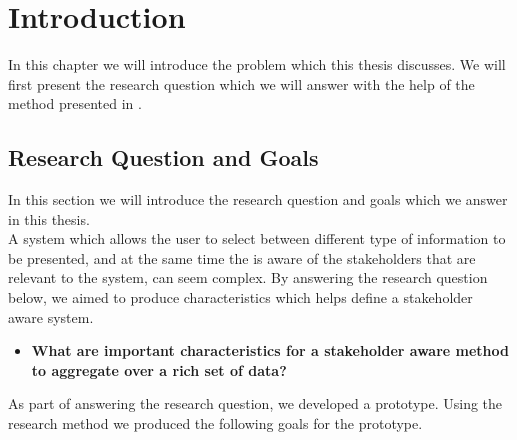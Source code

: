 
\chapter{Introduction}
\label{chapter:introduction}


In this chapter we will introduce the problem which this thesis discusses.
We will first present the research question which we will answer with the help
of the method presented in  .

\section{Research Question and Goals} %
\label{sec:intro_research_question}
In this section we will introduce the research question and goals which we 
answer in this thesis.\\

A system which allows the user to select between different type of information
to be presented, and at the same time the is aware of the stakeholders that are
relevant to the system, can seem complex. By answering the research question
below, we aimed to produce characteristics which helps define a
stakeholder aware system.\\

\begin{itemize}
	\item \textbf{What are important characteristics for a stakeholder aware 
	method to aggregate over a rich set of data?}
\end{itemize}

As part of answering the research question, we developed a prototype. Using the
research method we produced the following goals for the prototype.

